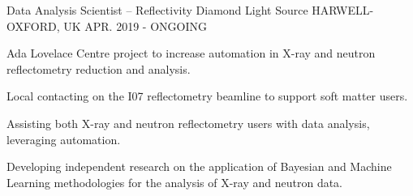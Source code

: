 \begin{cventries}
  \cventry
    {Data Analysis Scientist -- Reflectivity}
    {Diamond Light Source}
    {HARWELL-OXFORD, UK}
    {APR. 2019 - ONGOING}
    {
      \begin{cvitems}
        \item {Ada Lovelace Centre project to increase automation in X-ray and neutron reflectometry reduction and analysis.}
        \item {Local contacting on the I07 reflectometry beamline to support soft matter users.}
        \item {Assisting both X-ray and neutron reflectometry users with data analysis, leveraging automation.}
        \item {Developing independent research on the application of Bayesian and Machine Learning methodologies for the analysis of X-ray and neutron data.}
      \end{cvitems}
    }
\end{cventries}
